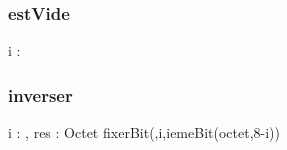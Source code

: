 \subsubsection{estVide}

\begin{algorithme}
        {i : \naturel}
        {
            {
                {}}
        }
\end{algorithme}

\subsubsection{inverser}

\begin{algorithme}
        {i : \naturel, res : Octet}
        {
            {fixerBit(,i,iemeBit(octet,8-i))}
        }
\end{algorithme}